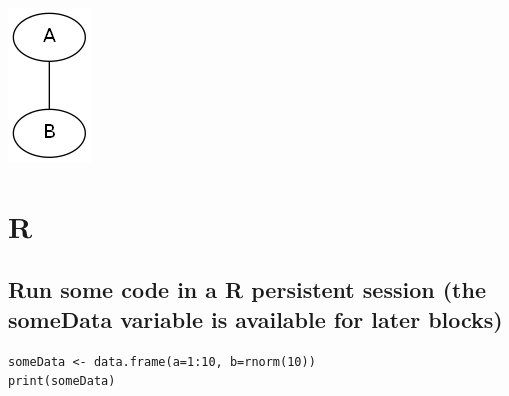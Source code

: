 \documentclass[11pt]{article}
\begin{document}
\includegraphics[width=.9\linewidth]{dotResult.png}

\section{R}
\label{sec-8}

\subsection{Run some code in a R persistent session (the someData variable is available for later blocks)}
\label{sec-8-1}
\begin{verbatim}
someData <- data.frame(a=1:10, b=rnorm(10))
print(someData)
\end{verbatim}
\end{document}
